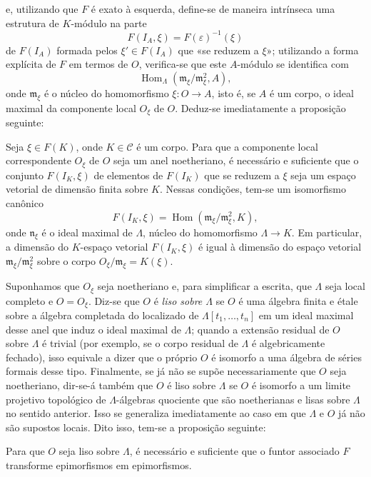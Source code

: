 e, utilizando que $F$ é exato à esquerda, define-se de maneira
intrínseca uma estrutura de $K$-módulo na parte
\[
  F(I_A,\xi)=F(\varepsilon)^{-1}(\xi)
\]
de $F(I_A)$ formada pelos $\xi'\in F(I_A)$ que «se reduzem a $\xi$»;
utilizando a forma explícita de $F$ em termos de $O$, verifica-se que este
$A$-módulo se identifica com
\[
  \operatorname{Hom}_{\Lambda}(\mathfrak m_\xi/\mathfrak m_\xi^2,A),
\]
onde $\mathfrak m_\xi$ é o núcleo do homomorfismo
$\xi:O\longrightarrow A$, isto é, se $A$ é um corpo, o ideal maximal da
componente local $O_\xi$ de $O$. Deduz-se imediatamente a proposição
seguinte:

 Seja $\xi\in F(K)$, onde $K\in\mathcal C$ é um
corpo. Para que a componente local correspondente $O_\xi$ de $O$ seja um
anel noetheriano, é necessário e suficiente que o conjunto $F(I_K,\xi)$ de
elementos de $F(I_K)$ que se reduzem a $\xi$ seja um espaço vetorial
de dimensão finita sobre $K$. Nessas condições, tem-se um isomorfismo
canônico
\[
  F(I_K,\xi)=
  \operatorname{Hom}\!\left(\mathfrak m_\xi/\mathfrak m_\xi^2,K\right),
\]
onde $\mathfrak n_\xi$ é o ideal maximal de $\Lambda$, núcleo do
homomorfismo $\Lambda\longrightarrow K$.
Em particular, a dimensão do $K$-espaço vetorial $F(I_K,\xi)$ é igual à
dimensão do espaço vetorial $\mathfrak m_\xi/\mathfrak m_\xi^2$ sobre o corpo
$O_\xi/\mathfrak m_\xi=K(\xi)$.

Suponhamos que $O_\xi$ seja noetheriano e, para simplificar a escrita, que
$\Lambda$ seja local completo e $O=O_\xi$. Diz-se que $O$ é \emph{liso sobre
$\Lambda$} se $O$ é uma álgebra finita e étale sobre a álgebra completada do
localizado de $\Lambda[t_1,\ldots,t_n]$ em um ideal maximal desse anel que
induz o ideal maximal de $\Lambda$; quando a extensão residual de $O$ sobre
$\Lambda$ é trivial (por exemplo, se o corpo residual de $\Lambda$ é
algebricamente fechado), isso equivale a dizer que o próprio $O$ é isomorfo a uma
álgebra de séries formais desse tipo.
Finalmente, se já não se supõe necessariamente que $O$ seja noetheriano, dir-se-á
também que $O$ é liso sobre $\Lambda$ se $O$ é isomorfo a um limite
projetivo topológico de $\Lambda$-álgebras quociente que são noetherianas e
lisas sobre $\Lambda$ no sentido anterior. Isso se generaliza imediatamente ao caso
em que $\Lambda$ e $O$ já não são supostos locais. Dito isso, tem-se a
proposição seguinte:

 Para que $O$ seja liso sobre $\Lambda$, é necessário
e suficiente que o funtor associado $F$ transforme epimorfismos em
epimorfismos.

